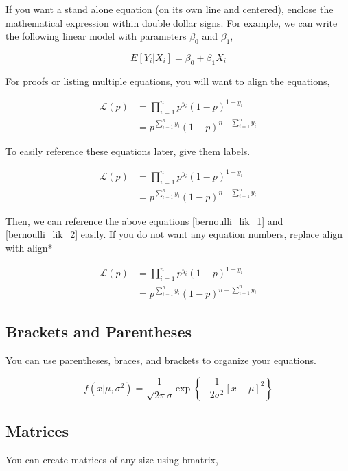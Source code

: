 \documentclass[11pt, oneside]{article}
\begin{document}
 If you want a stand alone equation (on its own line and centered),  enclose the mathematical expression within double dollar signs. For example, we can write the following linear model with parameters $\beta_0$ and $\beta_1$, 

$$ E[Y_i | X_i] = \beta_0 + \beta_1 X_i $$

\noindent For proofs or listing multiple equations, you will want to align the equations, 

\begin{align}
\mathcal{L}(p) & = \prod_{i=1}^n p^{y_i} (1-p)^{1-y_i} \\ 
& = p^{\sum_{i=1}^n y_i} (1-p)^{n - \sum_{i=1}^n y_i} 
\end{align}

\noindent To easily reference these equations later, give them labels.

\begin{align}
\mathcal{L}(p) & = \prod_{i=1}^n p^{y_i} (1-p)^{1-y_i} \label{bernoulli_lik_1} \\ 
& = p^{\sum_{i=1}^n y_i} (1-p)^{n - \sum_{i=1}^n y_i} \label{bernoulli_lik_2}
\end{align}

\noindent Then, we can reference the above equations \ref{bernoulli_lik_1} and \ref{bernoulli_lik_2} easily. If you do not want any equation numbers, replace align with align*

\begin{align*}
\mathcal{L}(p) & = \prod_{i=1}^n p^{y_i} (1-p)^{1-y_i} \\ 
& = p^{\sum_{i=1}^n y_i} (1-p)^{n - \sum_{i=1}^n y_i} 
\end{align*}

\subsection{Brackets and Parentheses}

You can use parentheses, braces, and brackets to organize your equations.  

$$  f \left( x | \mu, \sigma^2 \right) = \frac{1}{\sqrt{2\pi} \sigma } \exp \left\{ -\frac{1}{2\sigma^2} \left[ x - \mu \right]^2  \right\}  $$

\subsection{Matrices} 

You can create matrices of any size using bmatrix, 
\end{document}
